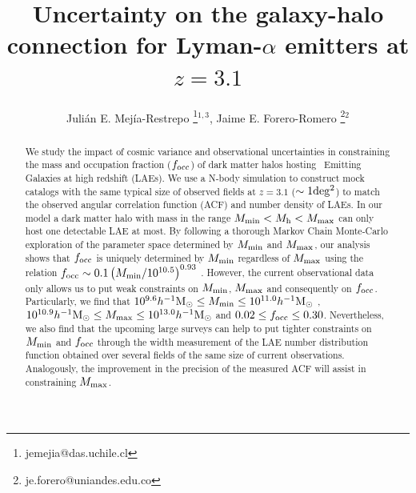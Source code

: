 \documentclass{emulateapj}
\newcommand{\ly}{{\ifmmode{{\rm Ly}\alpha}\else{Ly$\alpha$}\fi}}
\newcommand{\hMsun}{{\ifmmode{h^{-1}{\rm {M_{\odot}}}}\else{$h^{-1}{\rm{M_{\odot}}}$}\fi}}
\newcommand{\mmin}{{\ifmmode{{M_{\rm min}}}\else{${M_{\rm min}}$}\fi}}
\newcommand{\focc}{{\ifmmode{{f_{\rm occ}}}\else{${f_{\rm occ}}$}\fi}}
\begin{document}
\title{Uncertainty on the galaxy-halo connection for Lyman-$\alpha$ emitters at $z=3.1$}
\author{
  Juli\'an E. Mej\'ia-Restrepo \thanks{jemejia@das.uchile.cl}$^{1,3}$,
  Jaime E. Forero-Romero \thanks{je.forero@uniandes.edu.co}$^{2}$ 
}






\begin{abstract}
We study the impact of cosmic variance and observational uncertainties
in constraining the mass and  occupation fraction ($f_{\rm occ}$) of
dark matter halos hosting \ly\ Emitting  Galaxies at high redshift
(LAEs). 
We use a N-body simulation to construct mock catalogs with the same typical size  of observed fields at $z=3.1$ ($\sim 1 {\rm deg^2}$) to match the observed  angular correlation function (ACF) and number density of LAEs.  
In our model a dark matter halo with mass in the range $M_{\rm min}<M_{\mathrm h}<M_{\rm   max}$ can only host one detectable LAE at most. By following a thorough Markov Chain Monte-Carlo exploration of the parameter space determined by $M_{\rm min}$ and $M_{\rm   max}$, our analysis shows that $f_{\rm occ}$ is uniquely determined by $M_{\rm min}$ regardless of $M_{\rm max}$ using the relation $\focc\sim0.1\left(\mmin/10^{10.5}\right)^{0.93}$ . 
However, the current observational data only allows us to put weak constraints on $M_{\rm min}$, $M_{\rm max}$ and consequently on $f_{\rm occ}$. 
Particularly, we find that $10^{9.6}\hMsun\leq M_{\rm min}\leq 10^{11.0}\hMsun$ , $10^{10.9}\hMsun\leq M_{\rm max}\leq 10^{13.0}\hMsun$ and $0.02\leq f_{\rm occ}\leq 0.30$. 
Nevertheless, we also find that  the upcoming large surveys can help to put tighter constraints on $M_{\rm min}$ and $f_{\rm occ}$ through the width measurement of the LAE number distribution function obtained over several fields of the same size of current observations. 
Analogously, the  improvement in the precision of the measured ACF will assist in constraining $M_{\rm max}$.  
\end{abstract}
\end{document}
